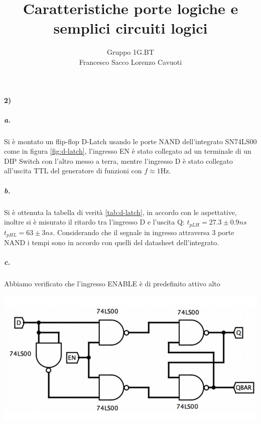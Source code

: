 \documentclass{article}
\date{}
\author{Gruppo 1G.BT \\ Francesco Sacco Lorenzo Cavuoti}
\title{Caratteristiche porte logiche e semplici circuiti logici}
\begin{document}
\maketitle
\paragraph{2)}
	\subparagraph{a.} Si è montato un flip-flop D-Latch usando le porte NAND dell'integrato SN74LS00 come in figura \ref{fig:d-latch}, l'ingresso EN è stato collegato ad un terminale di un DIP Switch con l'altro messo a terra, mentre l'ingresso D è stato collegato all'uscita TTL del generatore di funzioni con $f\approx1$Hz.
	\subparagraph{b.} Si è ottenuta la tabella di verità \ref{tab:d-latch}, in accordo con le aspettative, inoltre si è misurato il ritardo tra l'ingresso D e l'uscita Q: $t_{pLH}=27.3\pm0.9 ns$ $t_{pHL}=63\pm3 ns$. Considerando che il segnale in ingresso attraversa 3 porte NAND i tempi sono in accordo con quelli del datasheet dell'integrato.
	\subparagraph{c.} Abbiamo verificato che l'ingresso ENABLE è di predefinito attivo alto\newline
	
	\begin{minipage}{.6\linewidth}
		\centering
		\includegraphics[width=\linewidth]{immagini/dlach}
		\label{fig:d-latch}
	\end{minipage}
	\begin{minipage}{.4\linewidth}
		
		\label{tab:d-latch}
	\end{minipage}\newline
\end{document}
